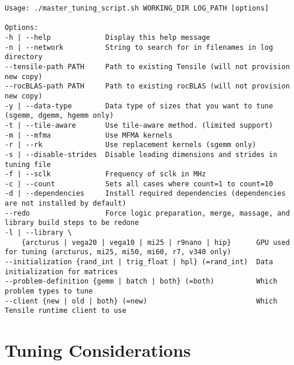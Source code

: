 \documentclass[]{article}
\begin{document}
\begin{lstlisting}
Usage: ./master_tuning_script.sh WORKING_DIR LOG_PATH [options]

Options:
-h | --help             Display this help message
-n | --network          String to search for in filenames in log directory
--tensile-path PATH     Path to existing Tensile (will not provision new copy)
--rocBLAS-path PATH     Path to existing rocBLAS (will not provision new copy)
-y | --data-type        Data type of sizes that you want to tune (sgemm, dgemm, hgemm only)
-t | --tile-aware       Use tile-aware method. (limited support)
-m | --mfma             Use MFMA kernels
-r | --rk               Use replacement kernels (sgemm only)
-s | --disable-strides  Disable leading dimensions and strides in tuning file
-f | --sclk             Frequency of sclk in MHz
-c | --count            Sets all cases where count=1 to count=10
-d | --dependencies     Install required dependencies (dependencies are not installed by default)
--redo                  Force logic preparation, merge, massage, and library build steps to be redone
-l | --library \
    {arcturus | vega20 | vega10 | mi25 | r9nano | hip}      GPU used for tuning (arcturus, mi25, mi50, mi60, r7, v340 only)
--initialization {rand_int | trig_float | hpl} (=rand_int)  Data initialization for matrices
--problem-definition {gemm | batch | both} (=both)          Which problem types to tune
--client {new | old | both} (=new)                          Which Tensile runtime client to use
\end{lstlisting}

\section{Tuning Considerations}
\end{document}
